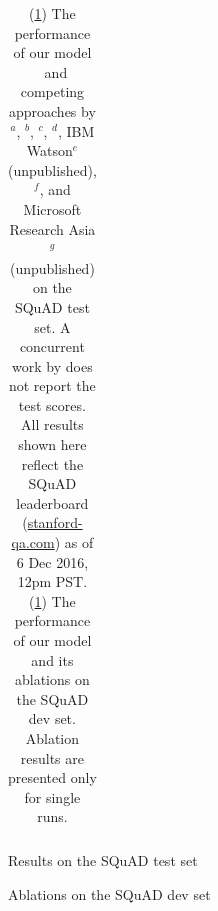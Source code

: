 \begin{table}[]
\begin{subfigure}[htbp]{0.6\textwidth}
{\begin{tabular}{lcccc}
    \end{tabular}
    }
    \caption{Results on the SQuAD test set}
    \label{tab:squad-test}
\end{subfigure}
\begin{subfigure}[htbp]{0.4\textwidth}
    \centering
    \caption{Ablations on the SQuAD dev set}
    \label{tab:squad-dev}
\end{subfigure}
\caption{(\ref{tab:squad-test}) The performance of our model \sysshort\ and competing approaches by \cite{rajpurkar2016squad}$^a$, \cite{chunk}$^b$, \cite{yang2016words}$^c$, \cite{wang2016machine}$^d$, IBM Watson$^e$ (unpublished), \cite{dcn}$^f$, and Microsoft Research Asia$^g$ (unpublished) on the SQuAD test set.
A concurrent work by \cite{lee2016learning} does not report the test scores. 
All results shown here reflect the SQuAD leaderboard (\url{stanford-qa.com}) as of 6 Dec 2016, 12pm PST. 
(\ref{tab:squad-dev}) The performance of our model and its ablations on the SQuAD dev set. Ablation results are presented only for single runs.}
\end{table}


